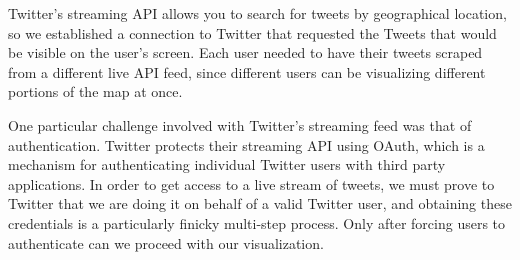 \documentclass[pdftex,12pt,a4paper]{article}
\begin{document}
Twitter's streaming API allows you to search for tweets by geographical
location, so we established a connection to Twitter that requested the Tweets
that would be visible on the user's screen. Each user needed to have their
tweets scraped from a different live API feed, since different users can be
visualizing different portions of the map at once.

One particular challenge involved with Twitter's streaming feed was that of
authentication. Twitter protects their streaming API using OAuth, which is a
mechanism for authenticating individual Twitter users with third party
applications. In order to get access to a live stream of tweets, we must prove
to Twitter that we are doing it on behalf of a valid Twitter user, and obtaining
these credentials is a particularly finicky multi-step process. Only after
forcing users to authenticate can we proceed with our visualization.
\end{document}
